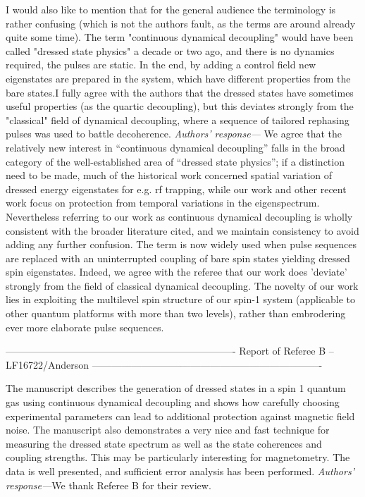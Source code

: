 \documentclass[letterpaper]{article}
\newenvironment{refcomment}{\singlespacing\verbatim}{\endverbatim}
\newcommand{\response}{\emph{Authors' response---}}
\begin{document}
\begin{refcomment}
I would also like to mention that for the general audience the
terminology is rather confusing (which is not the authors fault, as
the terms are around already quite some time). The term "continuous
dynamical decoupling" would have been called "dressed state physics" a
decade or two ago, and there is no dynamics required, the pulses are
static. In the end, by adding a control field new eigenstates are
prepared in the system, which have different properties from the bare
states.I fully agree with the authors that the dressed states have
sometimes useful properties (as the quartic decoupling), but this
deviates strongly from the "classical" field of dynamical decoupling,
where a sequence of tailored rephasing pulses was used to battle
decoherence.
\end{refcomment}
\response 
We agree that the relatively new interest in ``continuous dynamical decoupling'' falls in the broad category of the well-established area of ``dressed state physics''; if a distinction need to be made, much of the historical work concerned spatial variation of dressed energy eigenstates for e.g. rf trapping, while our work and other recent work focus on protection from temporal variations in the eigenspectrum. 
Nevertheless referring to our work as continuous dynamical decoupling is wholly consistent with the broader literature cited, and we maintain consistency to avoid adding any further confusion.
The term is now widely used when pulse sequences are replaced with an uninterrupted coupling of bare spin states yielding dressed spin eigenstates.
Indeed, we agree with the referee that our work does 'deviate' strongly from the field of classical dynamical decoupling. The novelty of our work lies in exploiting the multilevel spin structure of our spin-1 system (applicable to other quantum platforms with more than two levels), rather than embrodering ever more elaborate pulse sequences. 

\newpage
\begin{refcomment}
----------------------------------------------------------------------
Report of Referee B -- LF16722/Anderson
----------------------------------------------------------------------

The manuscript describes the generation of dressed states in a spin 1 
quantum gas using continuous dynamical decoupling and shows how 
carefully choosing experimental parameters can lead to
additional protection against magnetic field noise. The manuscript 
also demonstrates a very nice and fast technique for measuring the 
dressed state spectrum as well as the state coherences and coupling 
strengths. This may be particularly interesting for magnetometry. The 
data is well presented, and sufficient error analysis has been 
performed.
\end{refcomment}
\response We thank Referee B for their review.
\end{document}
